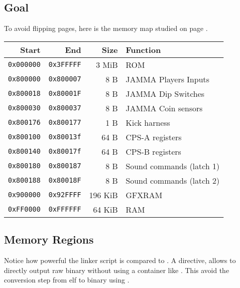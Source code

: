 \pagebreak

\subsection{Goal}
To avoid flipping pages, here is the memory map studied on page \pageref{m68k_mm}.

\begin{tabularx}{\textwidth}{rrrX}
\toprule    
  \textbf{Start } & \textbf{End  } & \textbf{Size } & \textbf{Function } \\               
  \toprule    
  \texttt{0x000000} & \texttt{0x3FFFFF} & 3 MiB & ROM \\
  \toprule    
  \texttt{0x800000} & \texttt{0x800007} & 8 B & JAMMA Players Inputs \\
  \texttt{0x800018} & \texttt{0x80001F} & 8 B & JAMMA Dip Switches \\
  \texttt{0x800030} & \texttt{0x800037} & 8 B & JAMMA Coin sensors \\
  \texttt{0x800176} & \texttt{0x800177} & 1 B & Kick harness \\
\toprule    
  \texttt{0x800100} & \texttt{0x80013f} & 64 B & CPS-A registers\\
  \texttt{0x800140} & \texttt{0x80017f} & 64 B & CPS-B registers\\
\toprule    
  \texttt{0x800180} & \texttt{0x800187} & 8 B & Sound commands (latch 1)\\
  \texttt{0x800188} & \texttt{0x80018F} & 8 B & Sound commands (latch 2)\\
  \toprule    
  \texttt{0x900000} & \texttt{0x92FFFF} & 196 KiB & GFXRAM\\
  \texttt{0xFF0000} & \texttt{0xFFFFFF} & 64 KiB & RAM \\
  \toprule    
\end{tabularx}%

\subsection{Memory Regions}



\begin{trivia}
Notice how powerful the linker script is compared to . A directive,  allows to directly output raw binary without using a container like . This avoid the conversion step from elf to binary using .
\end{trivia}


